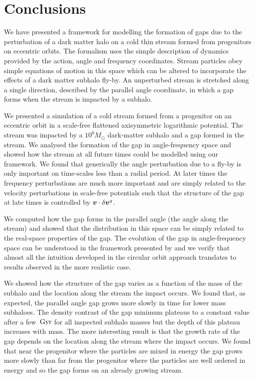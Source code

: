 \documentclass[useAMS,usenatbib,fleqn,a4paper]{mn2e}
\def\Gyr{\,{\rm Gyr}}
\newcommand{\bs}[1]{\bmath{#1}}
\begin{document}
\section{Conclusions}\label{Sect::Conclusions}
We have presented a framework for modelling the formation of gaps due to the perturbation of a dark matter halo on a cold thin stream formed from progenitors on eccentric orbits. The formalism uses the simple description of dynamics provided by the action, angle and frequency coordinates. Stream particles obey simple equations of motion in this space which can be altered to incorporate the effects of a dark matter subhalo fly-by. An unperturbed stream is stretched along a single direction, described by the parallel angle coordinate, in which a gap forms when the stream is impacted by a subhalo.

We presented a simulation of a cold stream formed from a progenitor on an eccentric orbit in a scale-free flattened axisymmetric logarithmic potential. The stream was impacted by a $10^8M_\odot$ dark-matter subhalo and a gap formed in the stream. We analysed the formation of the gap in angle-frequency space and showed how the stream at all future times could be modelled using our framework. We found that generically the angle perturbation due to a fly-by is only important on time-scales less than a radial period. At later times the frequency perturbations are much more important and are simply related to the velocity perturbations in scale-free potentials such that the structure of the gap at late times is controlled by $\bs{v}\cdot\delta\bs{v}^g$.

We computed how the gap forms in the parallel angle (the angle along the stream) and showed that the distribution in this space can be simply related to the real-space properties of the gap. The evolution of the gap in angle-frequency space can be understood in the framework presented by \cite{ErkalBelokurov2015} and we verify that almost all the intuition developed in the circular orbit approach translates to results observed in the more realistic case.

We showed how the structure of the gap varies as a function of the mass of the subhalo and the location along the stream the impact occurs. We found that, as expected, the parallel angle gap grows more slowly in time for lower mass subhaloes. The density contrast of the gap minimum plateaus to a constant value after a few $\Gyr$ for all inspected subhalo masses but the depth of this plateau increases with mass. The more interesting result is that the growth rate of the gap depends on the location along the stream where the impact occurs. We found that near the progenitor where the particles are mixed in energy the gap grows more slowly than far from the progenitor where the particles are well ordered in energy and so the gap forms on an already growing stream.
\end{document}
